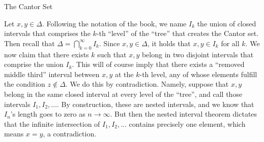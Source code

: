 \begin{section}{The Cantor Set}
\begin{solution}
    Let $x, y \in \Delta$.
    Following the notation of the book, we name $I_k$ the union of closed intervals that comprises the $k$-th ``level'' of the ``tree'' that creates the Cantor set.
    Then recall that $\Delta = \bigcap_{k=0}^{\infty} I_k$.
    Since $x, y \in \Delta$, it holds that $x, y \in I_k$ for all $k$.
    We now claim that there exists $k$ such that $x, y$ belong in two disjoint intervals that comprise the union $I_k$.
    This will of course imply that there exists a ``removed middle third'' interval between $x, y$ at the $k$-th level, any of whose elements fulfill the condition $z \notin \Delta$.
    We do this by contradiction. 
    Namely, suppose that $x, y$ belong in the same closed interval at every level of the ``tree'', and call those intervals $I_1, I_2, \ldots$.
    By construction, these are nested intervals, and we know that $I_n$'s length goes to zero as $n \rightarrow \infty$.
    But then the nested interval theorem dictates that the infinite intersection of $I_1, I_2, \ldots$ contains precisely one element, which means $x = y$, a contradiction.
\end{solution}

\end{section}